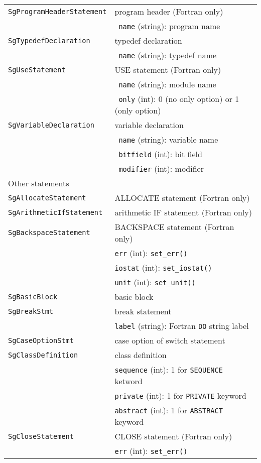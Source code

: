 \begin{longtable}[l]{l|p{10cm}}
 \texttt{SgProgramHeaderStatement}& program header (Fortran only)\\
 & ~\texttt{name} (string): program name\\
 \texttt{SgTypedefDeclaration}& typedef declaration\\
 & ~\texttt{name} (string): typedef name\\
 \texttt{SgUseStatement}& USE statement (Fortran only)\\
 & ~\texttt{name} (string): module name\\
 & ~\texttt{only} (int): 0 (no only option) or 1 (only option)\\
 \texttt{SgVariableDeclaration}& variable declaration \\
 & ~\texttt{name} (string): variable name\\
 & ~\texttt{bitfield} (int): bit field\\
 & ~\texttt{modifier} (int): modifier\\
 \hline
 \multicolumn{2}{l}{Other statements}\\
 \hline
 \texttt{SgAllocateStatement}& ALLOCATE statement (Fortran only)\\
 \texttt{SgArithmeticIfStatement}& arithmetic IF statement (Fortran only)\\
 \texttt{SgBackspaceStatement}& BACKSPACE statement (Fortran only)\\
 & \texttt{err} (int): \texttt{set\_err()}\\
 & \texttt{iostat} (int): \texttt{set\_iostat()}\\
 & \texttt{unit} (int): \texttt{set\_unit()}\\
 \texttt{SgBasicBlock}& basic block\\
 \texttt{SgBreakStmt}& break statement\\
 & \texttt{label} (string): Fortran \texttt{DO} string label\\
 \texttt{SgCaseOptionStmt}& case option of switch statement \\
 \texttt{SgClassDefinition}& class definition\\
 & \texttt{sequence} (int): 1 for \texttt{SEQUENCE} ketword\\
 & \texttt{private} (int):  1 for \texttt{PRIVATE} keyword\\
 & \texttt{abstract} (int): 1 for \texttt{ABSTRACT} keyword\\
 \texttt{SgCloseStatement}& CLOSE statement (Fortran only)\\
 & \texttt{err} (int): \texttt{set\_err()}\\

\end{longtable}
